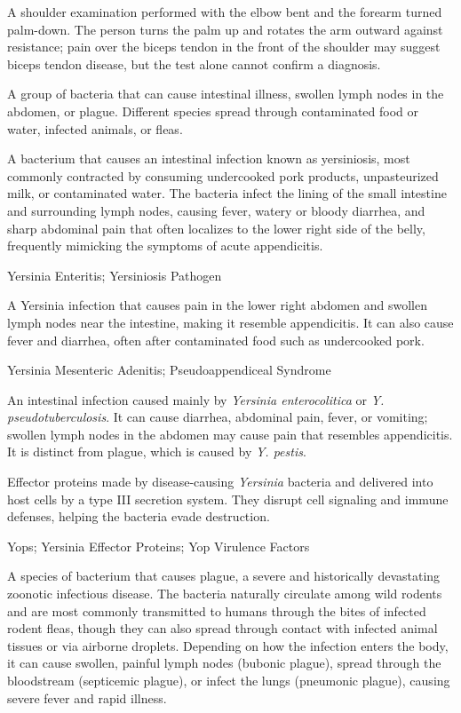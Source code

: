  A shoulder examination performed with the elbow bent and the forearm turned palm-down. The person turns the palm up and rotates the arm outward against resistance; pain over the biceps tendon in the front of the shoulder may suggest biceps tendon disease, but the test alone cannot confirm a diagnosis.

 A group of bacteria that can cause intestinal illness, swollen lymph nodes in the abdomen, or plague. Different species spread through contaminated food or water, infected animals, or fleas.

 A bacterium that causes an intestinal infection known as yersiniosis, most commonly contracted by consuming undercooked pork products, unpasteurized milk, or contaminated water. The bacteria infect the lining of the small intestine and surrounding lymph nodes, causing fever, watery or bloody diarrhea, and sharp abdominal pain that often localizes to the lower right side of the belly, frequently mimicking the symptoms of acute appendicitis.

\synonyms
Yersinia Enteritis; Yersiniosis Pathogen

 A Yersinia infection that causes pain in the lower right abdomen and swollen lymph nodes near the intestine, making it resemble appendicitis. It can also cause fever and diarrhea, often after contaminated food such as undercooked pork.

\synonyms
Yersinia Mesenteric Adenitis; Pseudoappendiceal Syndrome

 An intestinal infection caused mainly by \textit{Yersinia enterocolitica} or \textit{Y. pseudotuberculosis}. It can cause diarrhea, abdominal pain, fever, or vomiting; swollen lymph nodes in the abdomen may cause pain that resembles appendicitis. It is distinct from plague, which is caused by \textit{Y. pestis}.

 Effector proteins made by disease-causing \textit{Yersinia} bacteria and delivered into host cells by a type III secretion system. They disrupt cell signaling and immune defenses, helping the bacteria evade destruction.

\synonyms
Yops; Yersinia Effector Proteins; Yop Virulence Factors

 A species of bacterium that causes plague, a severe and historically devastating zoonotic infectious disease. The bacteria naturally circulate among wild rodents and are most commonly transmitted to humans through the bites of infected rodent fleas, though they can also spread through contact with infected animal tissues or via airborne droplets. Depending on how the infection enters the body, it can cause swollen, painful lymph nodes (bubonic plague), spread through the bloodstream (septicemic plague), or infect the lungs (pneumonic plague), causing severe fever and rapid illness.

